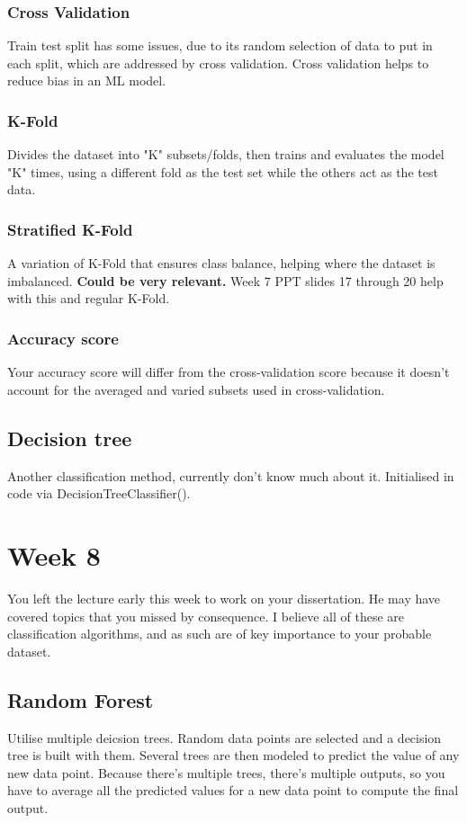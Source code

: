 \documentclass[12pt]{report}
\begin{document}
\subsubsection{Cross Validation}
Train test split has some issues, due to its random selection of data to put in each split, which are addressed by cross validation.
Cross validation helps to reduce bias in an ML model.
\subsubsection{K-Fold}
Divides the dataset into "K" subsets/folds, then trains and evaluates the model "K" times, using a different fold as the test set while the others 
act as the test data.
\subsubsection{Stratified K-Fold}
A variation of K-Fold that ensures class balance, helping where the dataset is imbalanced. \textbf{Could be very relevant.}
Week 7 PPT slides 17 through 20 help with this and regular K-Fold.
\subsubsection{Accuracy score}
Your accuracy score will differ from the cross-validation score because it doesn't account for the averaged and varied subsets
used in cross-validation.

\subsection{Decision tree}
Another classification method, currently don't know much about it.
Initialised in code via DecisionTreeClassifier().

\section{Week 8}
You left the lecture early this week to work on your dissertation. He may have covered topics that you missed by
consequence. I believe all of these are classification algorithms, and as such are of key importance to your probable 
dataset.

\subsection{Random Forest}
Utilise multiple deicsion trees. Random data points are selected and a decision tree is built with them. Several
trees are then modeled to predict the value of any new data point. Because there's multiple trees, there's multiple 
outputs, so you have to average all the predicted values for a new data point to compute the final output.
\end{document}
